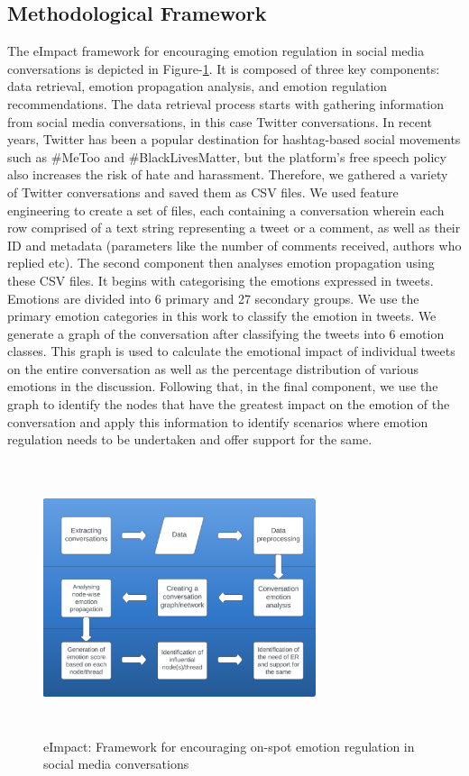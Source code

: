 \documentclass[acmtog]{acmart}
\begin{document}
\subsection{Methodological Framework}
The eImpact framework for encouraging emotion regulation in social media conversations is depicted in Figure-\ref{fig:Framework}. It is composed of three key components: data retrieval, emotion propagation analysis, and emotion regulation recommendations. The data retrieval process starts with gathering information from social media conversations, in this case Twitter conversations. In recent years, Twitter has been a popular destination for hashtag-based social movements such as \#MeToo and \#BlackLivesMatter, but the platform's free speech policy also increases the risk of hate and harassment. Therefore, we gathered a variety of Twitter conversations and saved them as CSV files. We used feature engineering to create a set of files, each containing a conversation wherein each row comprised of a text string representing a tweet or a comment, as well as their ID and metadata (parameters like the number of comments received, authors who replied etc). The second component then analyses emotion propagation using these CSV files. It begins with categorising the emotions expressed in tweets. Emotions are divided into 6 primary and 27 secondary groups. We use the primary emotion categories in this work to classify the emotion in tweets. We generate a graph of the conversation after classifying the tweets into 6 emotion classes. This graph is used to calculate the emotional impact of individual tweets on the entire conversation as well as the percentage distribution of various emotions in the discussion. Following that, in the final component, we use the graph to identify the nodes that have the greatest impact on the emotion of the conversation and apply this information to identify scenarios where emotion regulation needs to be undertaken and offer support for the same.
\begin{figure}[h]
  
    \centering
    \includegraphics[width=8cm,height=8cm,keepaspectratio]{framework.pdf}
  \caption{eImpact: Framework for encouraging on-spot emotion regulation in social media conversations}
  \label{fig:Framework}
  \end{figure}  
\end{document}
